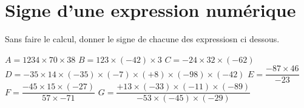 \section{Signe d'une expression numérique}

	 Sans faire le calcul, donner le signe de chacune des expressiosn ci dessous. 
\begin{questions}

		\question $A = 1234 \times 70 \times 38 $
		\question $B = 123 \times (-42) \times 3 $
		\question $C = -24 \times 32 \times (-62)$
		\question $D = -35 \times 14 \times (-35) \times (-7) \times (+8) \times (-98) \times (-42) $
		\question $E = \dfrac{-87 \times 46}{-23}$
		\question $F = \dfrac{-45 \times 15 \times (-27)}{57 \times -71}$
		\question $G = \dfrac{+13 \times (-33) \times (-11) \times (-89)}{-53 \times (-45) \times (-29)}$
	
\end{questions}